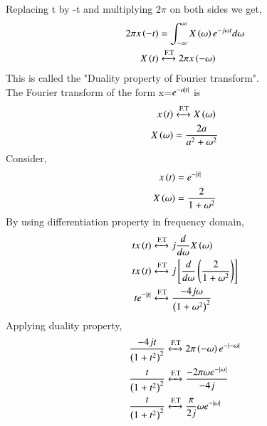 \documentclass[journal,12pt,twocolumn]{IEEEtran}
\theoremstyle{remark}
\begin{document}
Replacing t by -t and multiplying 2$\pi$ on both sides we get,
\begin{align}
    2\pi x\left(-t\right)&=\int_{-\infty}^{\infty}X\left(\omega\right)e^{-j\omega t}d\omega\\
    X\left(t\right)&\xleftrightarrow{\text{F.T}} 2\pi x\left(-\omega\right)
\end{align}
This is called the "Duality property of Fourier transform".\\
The Fourier transform of the form x=$e^{-a\left\vert t\right\vert}$ is 
\begin{align}
    x\left(t\right)&\xleftrightarrow{\text{F.T}} X\left(\omega\right)\\
    X\left(\omega\right)&= \frac{2a}{a^2+\omega^2}
\end{align}
Consider, 
\begin{align}
    x\left(t\right)&=e^{-\left\vert t\right\vert}\\
    X\left(\omega\right)&=\frac{2}{1+\omega^2}
\end{align}
By using differentiation property in frequency domain,
\begin{align}
    tx\left(t\right)&\xleftrightarrow{\text{F.T}}j\frac{d}{d\omega}X\left(\omega\right)\\
     tx\left(t\right)&\xleftrightarrow{\text{F.T}}j{}\left[\frac{d}{d\omega}\left(\frac{2}{1+\omega^2}\right)\right]\\
     te^{-\left\vert t\right\vert}&\xleftrightarrow{\text{F.T}}\frac{-4j\omega}{\left(1+\omega^2\right)^2}
\end{align}
Applying duality property,
\begin{align}
    \frac{-4jt}{\left(1+t^2\right)^2}&\xleftrightarrow{\text{F.T}}2\pi\left(-\omega\right)e^{-\left\vert-\omega\right\vert}\\
    \frac{t}{\left(1+t^2\right)^2}&\xleftrightarrow{\text{F.T}}\frac{-2\pi\omega e^{-\left\vert\omega\right\vert}}{-4j}\\
    \frac{t}{\left(1+t^2\right)^2}&\xleftrightarrow{\text{F.T}}\frac{\pi}{2j}\omega e^{-\left\vert\omega\right\vert}
\end{align}
\end{document}

